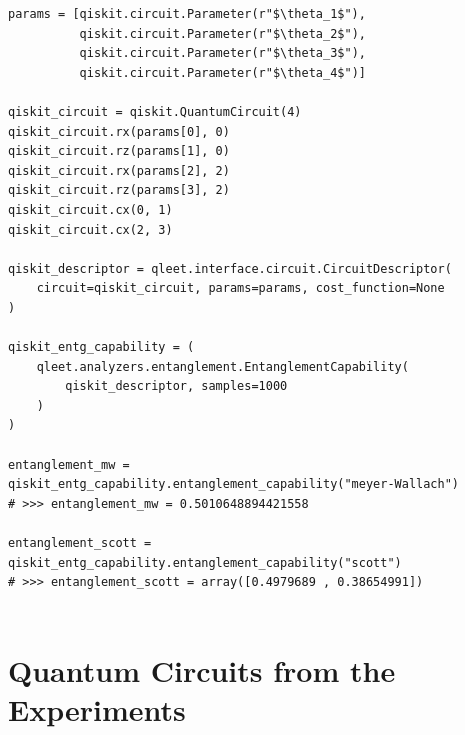 \documentclass[%
 reprint,
 amsmath,
 amssymb,
 showkeys,
 pra,
 floatfix,
 onecolumn,
]{revtex4-2}
\begin{document}
\begin{lstlisting}
params = [qiskit.circuit.Parameter(r"$\theta_1$"), 
          qiskit.circuit.Parameter(r"$\theta_2$"), 
          qiskit.circuit.Parameter(r"$\theta_3$"), 
          qiskit.circuit.Parameter(r"$\theta_4$")]

qiskit_circuit = qiskit.QuantumCircuit(4)
qiskit_circuit.rx(params[0], 0)
qiskit_circuit.rz(params[1], 0)
qiskit_circuit.rx(params[2], 2)
qiskit_circuit.rz(params[3], 2)
qiskit_circuit.cx(0, 1)
qiskit_circuit.cx(2, 3)

qiskit_descriptor = qleet.interface.circuit.CircuitDescriptor(
    circuit=qiskit_circuit, params=params, cost_function=None
)

qiskit_entg_capability = (
    qleet.analyzers.entanglement.EntanglementCapability(
        qiskit_descriptor, samples=1000
    )
)

entanglement_mw = qiskit_entg_capability.entanglement_capability("meyer-Wallach")
# >>> entanglement_mw = 0.5010648894421558

entanglement_scott = qiskit_entg_capability.entanglement_capability("scott")
# >>> entanglement_scott = array([0.4979689 , 0.38654991])


\end{lstlisting}

\section{Quantum Circuits from the Experiments}
\end{document}
